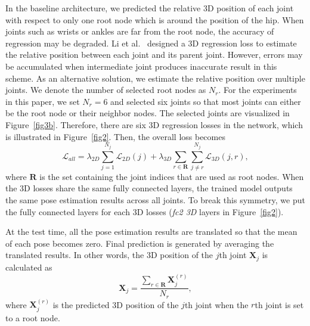 \documentclass[runningheads]{llncs}
\begin{document}
In the baseline architecture, we predicted the relative 3D position of each joint with respect to only one root node which is around the position of the hip. When joints such as wrists or ankles are far from the root node, the accuracy of regression may be degraded. Li et al.~\cite{li20143d} designed a 3D regression loss to estimate the relative position between each joint and its parent joint. However, errors may be accumulated when intermediate joint produces inaccurate result in this scheme. As an alternative solution, we estimate the relative position over multiple joints. We denote the number of selected root nodes as $N_r$. For the experiments in this paper, we set $N_r=6$ and selected six joints so that most joints can either be the root node or their neighbor nodes. The selected joints are visualized in Figure~\ref{fig3b}. Therefore, there are six 3D regression losses in the network, which is illustrated in Figure~\ref{fig2}. Then, the overall loss becomes
\begin{equation}\label{eq5}
  \mathcal{L}_{all} = \lambda_{2D} \sum_{j=1}^{N_j}\mathcal{L}_{2D}(j) + \lambda_{3D} \sum_{r \in \mathbf{R}} \sum_{j \neq r}^{N_j} \mathcal{L}_{3D} (j,r),
\end{equation}
where $\mathbf{R}$ is the set containing the joint indices that are used as root nodes. When the 3D losses share the same fully connected layers, the trained model outputs the same pose estimation results across all joints. To break this symmetry, we put the fully connected layers for each 3D losses (\textit{fc2 3D} layers in Figure~\ref{fig2}).

At the test time, all the pose estimation results are translated so that the mean of each pose becomes zero. Final prediction is generated by averaging the translated results. In other words, the 3D position of the $j$th joint $\mathbf{X}_{j}$ is calculated as
\begin{equation}\label{eq6}
  \mathbf{X}_{j} = \frac{\sum_{r \in \mathbf{R}} \mathbf{X}_{j}^{(r)}}{N_r},
\end{equation}
where $\mathbf{X}_{j}^{(r)}$ is the predicted 3D position of the $j$th joint when the $r$th joint is set to a root node.
\end{document}
